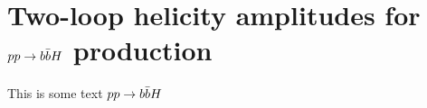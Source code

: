 \documentclass[main.tex]{subfiles}
\begin{document}
\chapter{Two-loop helicity amplitudes for $pp \rightarrow b\bar{b}H$ production} \label{sec:Hbb}
This is some text $pp \rightarrow b\bar{b}H$
\end{document}
